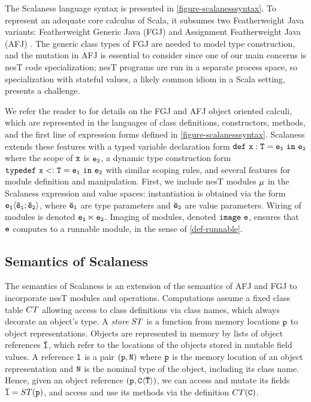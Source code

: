 \scalanesssyntaxfig The Scalaness language syntax is presented in
\autoref{figure-scalanesssyntax}. To represent an adequate core calculus of Scala, it subsumes
two Featherweight Java variants: Featherweight Generic Java (FGJ) \cite{FJ} and Assignment
Featherweight Java (AFJ) \cite{AFJ}. The generic class types of FGJ are needed to model type
construction, and the mutation in AFJ is essential to consider since one of our main concerns is
nesT code specialization; nesT programs are run in a separate process space, so specialization
with stateful values, a likely common idiom in a Scala setting, presents a challenge.

We refer the reader to \cite{FJ,AFJ} for details on the FGJ and AFJ object oriented calculi,
which are represented in the languages of class definitions, constructors, methods, and the
first line of expression forms defined in \autoref{figure-scalanesssyntax}. Scalaness extends
these features with a typed variable declaration form $\jdef{x}{T}{e_1}{e_2}$ where the scope of
$\ttt{x}$ is $\tt{e_2}$, a dynamic type construction form $\jtlet{x}{T}{e_1}{e_2}$ with similar
scoping rules, and several features for module definition and manipulation. First, we include
nesT modules $\jmodval$ in the Scalaness expression and value spaces: instantiation is obtained
via the form $\jinst{e_1}{\ttvec{e}_1; \ttvec{e}_2}$, where $\ttvec{e}_\tt{1}$ are type
parameters and $\ttvec{e}_\tt{2}$ are value parameters. Wiring of modules is denoted
$\jwire{\tt{e_1}}{\tt{e_2}}$. Imaging of modules, denoted $\jimage{\tt{e}}$, ensures that
$\tt{e}$ computes to a runnable module, in the sense of \autoref{def-runnable}.

\subsection{Semantics of Scalaness}

The semantics of Scalaness is an extension of the semantics of AFJ and FGJ to incorporate nesT
modules and operations. Computations assume a fixed class table $\CT$ allowing access to class
definitions via class names, which always decorate an object's type. A \emph{store} $\jstore$ is
a function from memory locations $\tt{p}$ to object representations. Objects are represented in
memory by lists of object references $\ttvec{l}$, which refer to the locations of the objects
stored in mutable field values. A reference $\tt{l}$ is a pair $\jref{\tt{p}}{N}$ where $\tt{p}$
is the memory location of an object representation and $\tt{N}$ is the nominal type of the
object, including its class name. Hence, given an object reference
$\jref{\tt{p}}{\jinst{C}{\ttvec{T}}}$, we can access and mutate its fields $\ttvec{l} =
\jstore(\tt{p})$, and access and use its methods via the definition $\CT(\tt{C})$.

